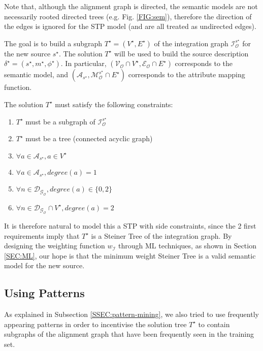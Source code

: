 \documentclass[letterpaper]{article} %
\begin{document}
Note that, although the alignment graph is directed, the semantic models are 
not necessarily rooted directed trees (e.g. Fig. \ref{FIG:sem}), therefore the 
direction of the edges is ignored for the STP model (and are all treated as 
undirected edges). 

The goal is to build a subgraph $T^\star= (V^\star, E^\star)$ 
of the integration graph 
$\mathcal{I}_\mathcal{O}^{s^\star}$ for the new source $s^\star$. The solution 
$T^\star$ will 
be used to build the source description $\delta^\star = (s^\star, m^\star, 
\phi^\star)$. 
In particular, $(\mathcal{V_O} \cap V^\star,\mathcal{E_O} \cap E^\star)$ 
corresponds to the semantic model, and 
$(\mathcal{A}_{s^\star},\mathcal{M}_\mathcal{O}^{s^\star} \cap E^\star)$ 
corresponds to 
the attribute mapping function.

The solution $T^\star$ must satisfy the following constraints:
\begin{enumerate}
	\item $T^\star$ must be a subgraph of $\mathcal{I}_\mathcal{O}^{s^\star}$
	\item $T^\star$ must be a tree (connected acyclic graph)
	\item $\forall a \in \mathcal{A}_{s^\star}, a\in V^\star$
	\item $\forall a \in \mathcal{A}_{s^\star}, degree(a) = 1$
	\item $\forall n \in \mathcal{D_{G_O}}, degree(a) \in 
	\{0,2\}$
	\item $\forall n \in \mathcal{D_{G_O}} \cap V^\star, 
	degree(a) = 2$
\end{enumerate}

It is therefore natural to model this a STP with side constraints, since the 2 
first requirements imply that $T^\star$ is a Steiner Tree of the integration 
graph. By designing the weighting function $w_\mathcal{I}$ through ML 
techniques, as shown in Section \ref{SEC:ML}, 
our hope is that the minimum weight Steiner Tree is a valid semantic model for 
the new source.


\subsection{Using Patterns}

As explained in Subsection \ref{SSEC:pattern-mining}, we also tried to use 
frequently appearing patterns in order to incentivise the solution tree 
$T^\star$ to contain subgraphs of the alignment graph that have been frequently 
seen in the training set.
\end{document}
